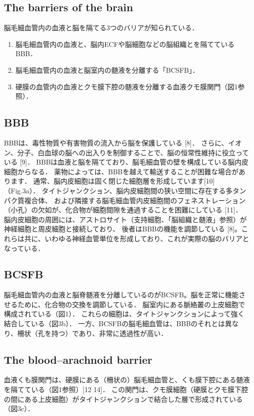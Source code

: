 \documentclass[11pt,a4paper]{jsarticle}
\begin{document}
\subsection{The barriers of the brain}
脳毛細血管内の血液と脳を隔てる3つのバリアが知られている．
\begin{enumerate}
    \item 脳毛細血管内の血液と、脳内ECFや脳細胞などの脳組織とを隔てているBBB． 
    \item 脳毛細血管内の血液と脳室内の髄液を分離する「BCSFB」．
    \item 硬膜の血管内の血液とクモ膜下腔の髄液を分離する血液クモ膜関門（図1参照）．
\end{enumerate}
\subsection{BBB}
BBBは、毒性物質や有害物質の流入から脳を保護している [8]．
さらに、イオン、分子、白血球の脳への出入りを制御することで、脳の恒常性維持に役立っている [9]．
BBBは血液と脳を隔てており、脳毛細血管の壁を構成している脳内皮細胞からなる．
薬物によっては、BBBを越えて輸送することが困難な場合があります．
通常、脳内皮細胞は固く閉じた細胞層を形成しています[10]（Fig.3a）．
タイトジャンクション、脳内皮細胞間の狭い空間に存在する多タンパク質複合体、
および隣接する脳毛細血管内皮細胞間のフェネストレーション（小孔）の欠如が、化合物が細胞間隙を通過することを困難にしている [11]．
脳内皮細胞の周囲には、アストロサイト（支持細胞、「脳組織と髄液」参照）が神経細胞と周皮細胞と接続しており、
後者はBBBの機能を調節している [8]。これらは共に、いわゆる神経血管単位を形成しており、これが実際の脳のバリアとなっている．
\subsection{BCSFB}
脳毛細血管内の血液と脳脊髄液を分離しているのがBCSFB。脳を正常に機能させるために、化合物の交換を調節している．
脳室内にある脈絡叢の上皮細胞で構成されている（図1）．
これらの細胞は、タイトジャンクションによって強く結合している（図3b）．
一方、BCSFBの脳毛細血管は、BBBのそれとは異なり、柵状（孔を持つ）であり、非常に透過性が高い．
\subsection{The blood–arachnoid barrier}
血液くも膜関門は、硬膜にある（柵状の）脳毛細血管と、くも膜下腔にある髄液を隔てている（図1参照）[12 14]．
この関門は、クモ膜細胞（硬膜とクモ膜下腔の間にある上皮細胞）がタイトジャンクションで結合した層で形成されている（図3c）．
\end{document}

